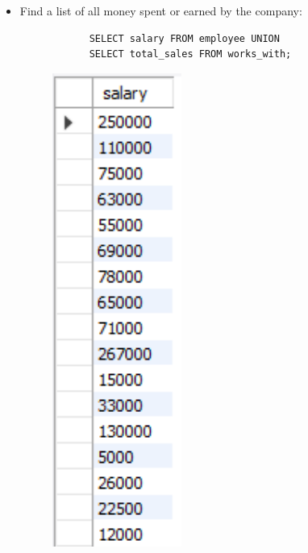 \begin{itemize}
    \item Find a list of all money spent or earned by the company:
        \begin{verbatim}
            SELECT salary FROM employee UNION 
            SELECT total_sales FROM works_with;
        \end{verbatim}
        \begin{figure}[H]
            \centering
            \includegraphics[width=0.4\textwidth]{./Figs/2020-12-24-21-04-28.png}
        \end{figure}
\end{itemize}
